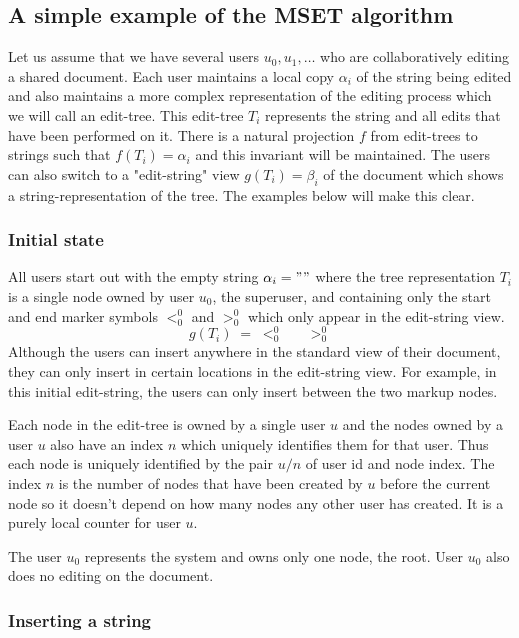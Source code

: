 \documentclass{amsart}
\begin{document}
\subsection{A simple example of the MSET algorithm}
Let us assume that we have several users $u_0,u_1,\ldots$ who are
collaboratively editing a shared document. Each user maintains a local
copy $\alpha_i$ of the string being edited and also maintains a more complex representation of the editing process
which we will call an edit-tree.
This edit-tree $T_i$ represents the string and all edits that have been
performed on it. There is a natural projection $f$ from edit-trees to
strings such that $f(T_i)=\alpha_i$ and this invariant will be maintained.
The users can also switch to a "edit-string" view 
$g(T_i)=\beta_i$ of the document
which shows a string-representation of the tree. The examples below will
make this clear.

\subsubsection{Initial state}
All users start out with the empty string $\alpha_i=""$ where the
tree representation $T_i$ is a single node owned by user $u_0$, the superuser,
and containing only the start and end marker symbols $<^0_0$ and $>^0_0$
which only appear in the edit-string view.
\[
g(T_i) \;=\; <_0^0 \;\;\;\;\;\; >_0^0
\]
Although the users can insert anywhere in the standard view of their document,
they can only insert in certain locations in the edit-string view.
For example, in this initial edit-string, 
the users can only insert between the two markup nodes.

Each node in the edit-tree is owned by
a single user $u$ and the nodes owned by a user $u$ also have an index $n$
which uniquely identifies them for that user. Thus each node
is uniquely identified by the pair $u/n$ of user id and node index.
The index $n$ is the number of nodes that have been created by $u$ before
the current node so it doesn't depend on how many nodes any other user
has created. It is a purely local counter for user $u$.

The user $u_0$ represents the
system and owns only one node, the root. User $u_0$ also does no editing on
the document.

\subsubsection{Inserting a string}
\end{document}
